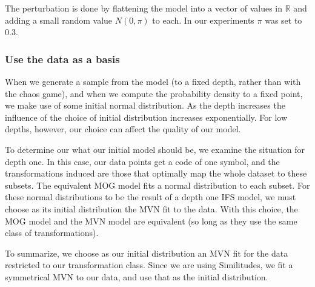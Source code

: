 \documentclass[10pt,a4paper,oneside]{article}
\theoremstyle{definition}
\begin{document}
The perturbation is done by flattening the model into a vector of values in ${\mathbb R}$ and adding a small random value $N(0, \pi)$ to each. In our experiments $\pi$ was set to 0.3. 

\subsubsection*{Use the data as a basis}

When we generate a sample from the model (to a fixed depth, rather than with the chaos game), and when we compute the probability density to a fixed point, we make use of some initial normal distribution. As the depth increases the influence of the choice of initial distribution increases exponentially. For low depths, however, our choice can affect the quality of our model. 

To determine our what our initial model should be, we examine the situation for depth one. In this case, our data points get a code of one symbol, and the transformations induced are those that optimally map the whole dataset to these subsets. The equivalent MOG model fits a normal distribution to each subset. For these normal distributions to be the result of a depth one IFS model, we must choose as its initial distribution the MVN fit to the data. With this choice, the MOG model and the MVN model are equivalent (so long as they use the same class of transformations).

To summarize, we choose as our initial distribution an MVN fit for the data restricted to our transformation class. Since we are using Similitudes, we fit a symmetrical MVN to our data, and use that as the initial distribution.




\end{document}
